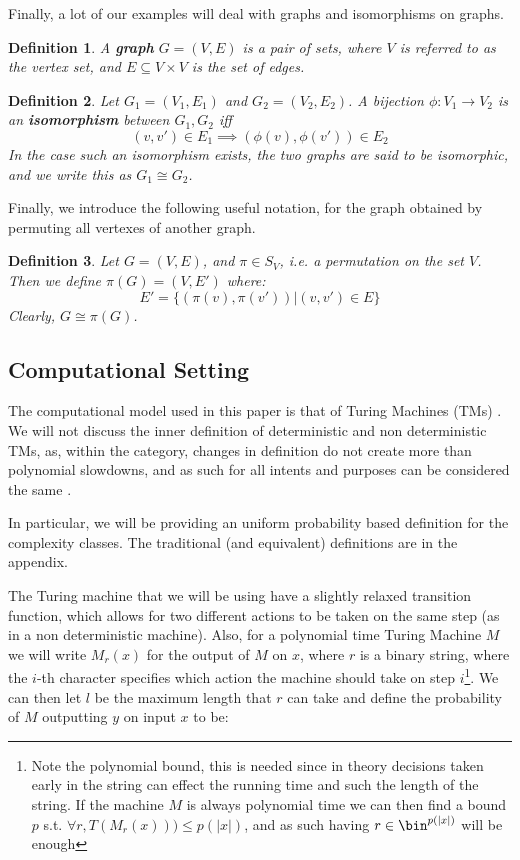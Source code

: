 \documentclass{article}
\newtheorem{definition}{Definition}
\begin{document}
Finally, a lot of our examples will deal with graphs and isomorphisms on graphs.

\begin{definition}
A \textbf{graph} $G = (V, E)$ is a pair of sets, where $V$ is referred to as the vertex set, and $E \subseteq V \times V$ is the set of edges.  
\end{definition}

\begin{definition}
    Let $G_1 = (V_1, E_1)$ and $G_2 = (V_2, E_2)$. A bijection $\phi: V_1 \to V_2$ is an \textbf{isomorphism} between $G_1, G_2$ iff 
    \[ (v, v') \in E_1 \implies (\phi(v), \phi(v')) \in E_2 \] 
    In the case such an isomorphism exists, the two graphs are said to be isomorphic, and we write this as $G_1 \cong G_2$. 
\end{definition}

Finally, we introduce the following useful notation, for the graph obtained by permuting all vertexes of another graph.
\begin{definition}
    Let $G = (V, E)$, and $\pi \in S_V$, i.e. a permutation on the set $V$. Then we define $\pi(G) = (V, E')$ where:
    \[ E' = \{ (\pi(v), \pi(v')) | (v, v') \in E \} \]
    Clearly, $G \cong \pi(G)$.
\end{definition}

\subsection{Computational Setting}
The computational model used in this paper is that of Turing Machines (TMs) \cite{turingComputableNumbersApplication1937}. We will not discuss the inner definition of deterministic and non deterministic TMs, as, within the category, changes in definition do not create more than polynomial slowdowns, and as such for all intents and purposes can be considered the same \cite{aroraComputationalComplexityModern2009}. 

In particular, we will be providing an uniform probability based definition for the complexity classes. The traditional (and equivalent) definitions are in the appendix.

The Turing machine that we will be using have a slightly relaxed transition function, which allows for two different actions to be taken on the same step (as in a non deterministic machine). Also, for a polynomial time Turing Machine $M$ we will write $M_r(x)$ for the output of $M$ on $x$, where $r$ is a binary string, where the $i$-th character specifies which action the machine should take on step $i$\footnote{Note the polynomial bound, this is needed since in theory decisions taken early in the string can effect the running time and such the length of the string. If the machine $M$ is always polynomial time we can then find a bound $p$ s.t. $\forall r, T(M_r(x))) \leq p(|x|) $, and as such having $r \in \bin^{p(|x|)}$ will be enough}. We can then let $l$ be the maximum length that $r$ can take and define the probability of $M$ outputting $y$ on input $x$ to be:
\end{document}
